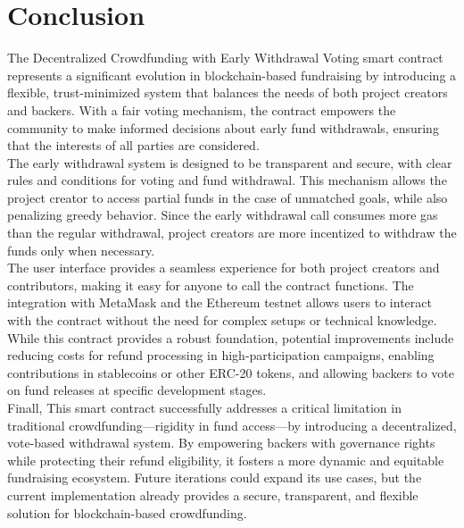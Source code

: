 \documentclass[12pt,reqno]{article}
\begin{document}
\section{Conclusion}
The Decentralized Crowdfunding with Early Withdrawal Voting 
smart contract represents a significant evolution in 
blockchain-based fundraising by introducing a flexible, 
trust-minimized system that balances the needs of both project 
creators and backers. With a fair voting mechanism, 
the contract empowers the community to make informed 
decisions about early fund withdrawals, ensuring that 
the interests of all parties are considered.  \\ 
\newline 
The early withdrawal system is designed to be transparent 
and secure, with clear rules and conditions for voting and fund 
withdrawal. This mechanism allows the project creator to access 
partial funds in the case of unmatched goals, while also 
penalizing greedy behavior. Since the early withdrawal call 
consumes more gas than the regular withdrawal, project creators 
are more incentized to withdraw the funds only when necessary. \\ 
\newline 
The user interface provides a seamless experience for both 
project creators and contributors, making it easy for anyone 
to call the contract functions. The integration with MetaMask 
and the Ethereum testnet allows users to interact with the
contract without the need for complex setups or technical
knowledge. \\
\newline 
While this contract provides a robust foundation, 
potential improvements include reducing costs for refund 
processing in high-participation campaigns, enabling contributions 
in stablecoins or other ERC-20 tokens, and
allowing backers to vote on fund releases at specific development 
stages.\\ 
\newline 
Finall, This smart contract successfully addresses a critical 
limitation in traditional crowdfunding—rigidity in fund 
access—by introducing a decentralized, vote-based withdrawal 
system. By empowering backers with governance rights while 
protecting their refund eligibility, it fosters a more dynamic 
and equitable fundraising ecosystem. Future iterations could 
expand its use cases, but the current implementation already
provides a secure, transparent, and flexible solution for 
blockchain-based crowdfunding.
\end{document}
